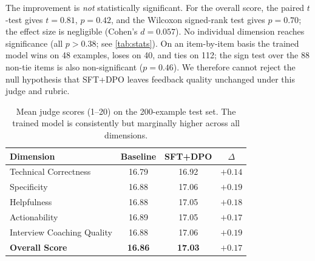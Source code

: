  The improvement is \emph{not} statistically
significant. For the overall score, the paired $t$-test gives $t=0.81$,
$p=0.42$, and the Wilcoxon signed-rank test gives $p=0.70$; the effect size is
negligible (Cohen's $d=0.057$). No individual dimension reaches significance
(all $p>0.38$; see \cref{tab:stats}). On an item-by-item basis the trained
model wins on 48 examples, loses on 40, and ties on 112; the sign test over the
88 non-tie items is also non-significant ($p=0.46$). We therefore cannot reject
the null hypothesis that SFT+DPO leaves feedback quality unchanged under this
judge and rubric.

\begin{table}[t]
  \centering
  \small
  \begin{tabular}{@{}lccc@{}}
    \toprule
    Dimension & Baseline & SFT+DPO & $\Delta$ \\
    \midrule
    Technical Correctness        & 16.79 & 16.92 & $+0.14$ \\
    Specificity                  & 16.88 & 17.06 & $+0.19$ \\
    Helpfulness                  & 16.88 & 17.05 & $+0.18$ \\
    Actionability                & 16.89 & 17.05 & $+0.17$ \\
    Interview Coaching Quality   & 16.88 & 17.06 & $+0.19$ \\
    \midrule
    \textbf{Overall Score}       & \textbf{16.86} & \textbf{17.03} & $\mathbf{+0.17}$ \\
    \bottomrule
  \end{tabular}
  \caption{Mean judge scores (1--20) on the 200-example test set. The trained
  model is consistently but marginally higher across all dimensions.}
  \label{tab:results}
\end{table}

